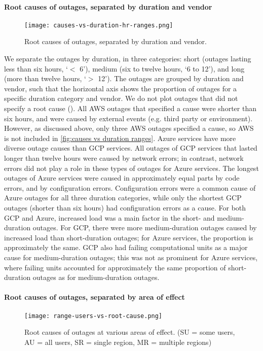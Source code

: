 \paragraph{Root causes of outages, separated by duration and vendor}
\begin{figure}
  \centering
  \texttt{[image: causes-vs-duration-hr-ranges.png]}
  \caption{Root causes of outages, separated by duration and vendor.}
  \label{fig:causes vs duration ranges}
\end{figure}

We separate the outages by duration, in three categories: short (outages lasting less than six hours, `$<$ 6'), medium (six to twelve hours, `6 to 12'), and long (more than twelve hours, `$>$ 12').
The outages are grouped by duration and vendor, such that the horizontal axis shows the proportion of outages for a specific duration category and vendor.
We do not plot outages that did not specify a root cause ().
All AWS outages that specified a cause were shorter than six hours, and were caused by external events (e.g. third party or environment).
However, as discussed above, only three AWS outages specified a cause, so AWS is not included in \autoref{fig:causes vs duration ranges}.
Azure services have more diverse outage causes than GCP services.
All outages of GCP services that lasted longer than twelve hours were caused by network errors; in contrast, network errors did not play a role in these types of outages for Azure services.
The longest outages of Azure services were caused in approximately equal parts by code errors, and by configuration errors.
Configuration errors were a common cause of Azure outages for all three duration categories, while only the shortest GCP outages (shorter than six hours) had configuration errors as a cause.
For both GCP and Azure, increased load was a main factor in the short- and medium-duration outages.
For GCP, there were more medium-duration outages caused by increased load than short-duration outages; for Azure services, the proportion is approximately the same.
GCP also had failing computational units as a major cause for medium-duration outages; this was not as prominent for Azure services, where failing units accounted for approximately the same proportion of short-duration outages as for medium-duration outages.

\paragraph{Root causes of outages, separated by area of effect}
\begin{figure}
  \centering
  \texttt{[image: range-users-vs-root-cause.png]}
  \caption{Root causes of outages at various areas of effect. (SU = some users, AU = all users, SR = single region, MR = multiple regions)}
  \label{fig:causes vs aoes}
\end{figure}

